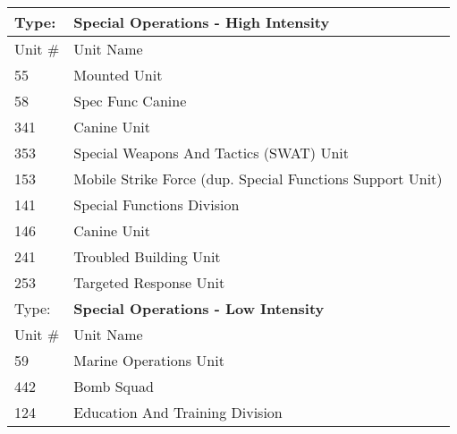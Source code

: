 \begin{table}
\tiny
\centering
\caption{}\label{tab:specops}
\begin{tabular}{|ll|}
\hline
Type:	&\textbf{Special Operations - High Intensity}\\ 
\hline
Unit \#	&Unit Name \\
\hline
55	&Mounted Unit\\
58	&Spec Func Canine\\
341	&Canine Unit\\
353	&Special Weapons And Tactics (SWAT) Unit\\
153	&Mobile Strike Force (dup. Special Functions Support Unit)\\
141	&Special Functions Division\\
146	&Canine Unit\\
241	&Troubled Building Unit\\
253	&Targeted Response Unit\\
\hline
Type:	&\textbf{Special Operations - Low Intensity}\\
\hline
Unit \#	&Unit Name \\
\hline
59	&Marine Operations Unit\\
442	&Bomb Squad\\
124	&Education And Training Division\\
\hline
\end{tabular}
\end{table}

